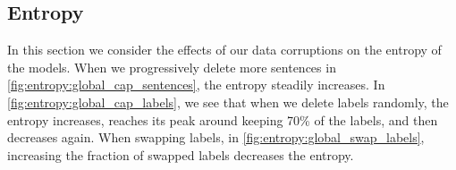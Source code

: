 \documentclass{article}
\newcommand{\mike}[1]{\textcolor{red}{#1}}
\begin{document}
%     

\subsection{Entropy}
In this section we consider the effects of our data corruptions on the entropy of the models. When we progressively delete more sentences in \autoref{fig:entropy:global_cap_sentences}, the entropy steadily increases. In \autoref{fig:entropy:global_cap_labels}, we see that when we delete labels randomly, the entropy increases, reaches its peak around keeping 70\% of the labels, and then decreases again. When swapping labels, in \autoref{fig:entropy:global_swap_labels}, increasing the fraction of swapped labels decreases the entropy.
\end{document}
